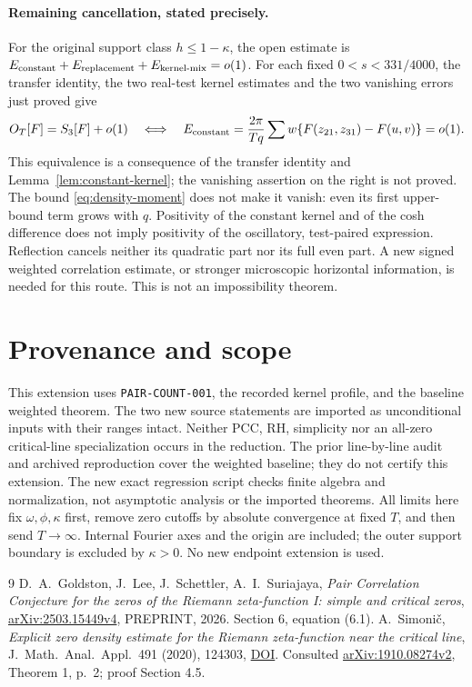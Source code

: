 \documentclass[11pt]{article}
\begin{document}
\paragraph{Remaining cancellation, stated precisely.}
For the original support class $h\leq1-\kappa$, the open estimate is
$E_{\rm constant}+E_{\rm replacement}+E_{\rm kernel\text{-}mix}=o(1)$.
For each fixed $0<s<331/4000$, the transfer identity, the two real-test
kernel estimates and the two vanishing errors just proved give
\[
 O_T[F]=S_3[F]+o(1)\quad\Longleftrightarrow\quad
 E_{\rm constant}=\frac{2\pi}{Tq}\sum w
       \{F(z_{21},z_{31})-F(u,v)\}=o(1).
\]
This equivalence is a consequence of the transfer identity and
Lemma~\ref{lem:constant-kernel}; the vanishing assertion on the right
is not proved. The bound \eqref{eq:density-moment} does not make it
vanish: even its first upper-bound term grows with $q$. Positivity of
the constant kernel and of the cosh difference does not imply positivity
of the oscillatory, test-paired expression. Reflection cancels neither
its quadratic part nor its full even part. A new signed weighted
correlation estimate, or stronger microscopic horizontal information,
is needed for this route. This is not an impossibility theorem.

\section{Provenance and scope}
This extension uses \texttt{PAIR-COUNT-001}, the recorded kernel profile,
and the baseline weighted theorem. The two new source statements are
imported as unconditional inputs with their ranges intact. Neither
PCC, RH, simplicity nor an all-zero critical-line specialization occurs
in the reduction. The prior line-by-line audit and archived reproduction
cover the weighted baseline; they do not certify this extension.
The new exact regression script checks finite algebra and normalization,
not asymptotic analysis or the imported theorems.
All limits here fix $\omega,\phi,\kappa$ first, remove zero cutoffs by
absolute convergence at fixed $T$, and then send $T\to\infty$.
Internal Fourier axes and the origin are included; the outer support
boundary is excluded by $\kappa>0$. No new endpoint extension is used.

\begin{thebibliography}{9}
D.~A.~Goldston, J.~Lee, J.~Schettler, A.~I.~Suriajaya,
\emph{Pair Correlation Conjecture for the zeros of the Riemann
zeta-function I: simple and critical zeros},
\href{https://arxiv.org/abs/2503.15449v4}{arXiv:2503.15449v4},
PREPRINT, 2026. Section 6, equation (6.1).
A.~Simoni\v c, \emph{Explicit zero density estimate for the Riemann
zeta-function near the critical line}, J.~Math.~Anal.~Appl.~491 (2020),
124303, \href{https://doi.org/10.1016/j.jmaa.2020.124303}{DOI}.
Consulted \href{https://arxiv.org/abs/1910.08274v2}{arXiv:1910.08274v2},
Theorem 1, p.~2; proof Section 4.5.
\end{thebibliography}
\end{document}
